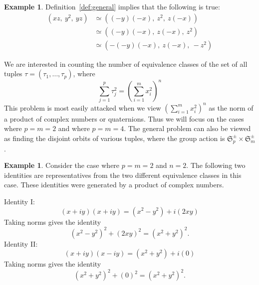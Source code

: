\documentclass[12pt,table]{article}
\theoremstyle{definition}
\newtheorem{example}[theorem]{Example}
\theoremstyle{remark}
\newcommand{\Zzz}{\mathbb Z}
\numberwithin{equation}{section}
\begin{document}
\begin{example}
Definition~\ref{def:general} implies that the following is true:
\begin{align*}
( xz,\: y^2,\: yz )  
&\simeq ( (-y)(-x),\: z^2,\: z(-x) ) \\
&\simeq ( (-y)(-x),\: z(-x),\: z^2 ) \\
&\simeq ( -(-y)(-x),\: z(-x),\: -z^2 ) 
\end{align*}
\end{example}



We are interested in counting the number of
equivalence classes of the set of all tuples
 $ \tau = ( \tau_1, \ldots, \tau_p) $,
where
\begin{equation}
\label{equation_general}
\sum_{j = 1}^{p}  \tau_j ^ 2  
= 
\left( \sum_{i = 1}^{m}  x_i ^ 2  \right) ^ n 
\end{equation}
This problem is most easily attacked when we
view $ \left( \sum_{i = 1}^{m}  x_i ^ 2  \right) ^ n $
as the norm of a product of complex numbers or quaternions.
Thus we will focus on the cases where $ p = m = 2 $ and where $ p = m = 4 $.
The general problem can also be viewed as finding the disjoint orbits of 
various tuples, where the group action is $ \mathfrak{S}_p^\pm \times \mathfrak{S}_m^\pm $.



\begin{example}

Consider the case where $ p = m = 2 $ and $ n = 2$.
The following two identities are representatives from 
the two different equivalence classes in this case. These identities
were generated by a product of complex numbers. 

\noindent
Identity I:
\begin{equation*}
(x + iy)(x + iy) = (x^2 - y^2 ) + i(2xy) 
\end{equation*}
Taking norms gives the identity
\begin{equation}
    (x^2 - y^2 )^2 + (2xy)^2 
    = (x^2 + y^2)^2.
\end{equation}
Identity II:
\begin{equation*}
    (x + iy )(x - iy )
    = (x^2 + y^2 ) + i(0)  
\end{equation*}
Taking norms gives the identity
\begin{equation}
    (x^2 + y^2 )^2 + (0)^2
    = (x^2 + y^2 )^2.
\end{equation}
\end{example}
\end{document}
